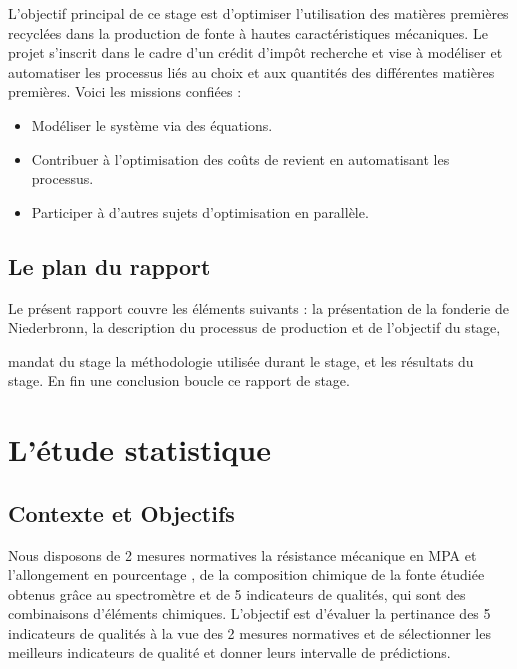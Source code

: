 \documentclass[12pt]{article}
\begin{document}
L’objectif principal de ce stage est d’optimiser l’utilisation des matières 
premières recyclées dans la production de fonte à hautes caractéristiques 
mécaniques. Le projet s’inscrit dans le cadre d’un crédit d’impôt recherche 
et vise à modéliser et automatiser les processus liés au choix et aux 
quantités des différentes matières premières. Voici les missions confiées :

\begin{itemize}
    \item Modéliser le système via des équations.
    \item Contribuer à l’optimisation des coûts de revient en 
    automatisant les processus.
    \item Participer à d’autres sujets d’optimisation en parallèle.
\end{itemize}


\subsection{Le plan du rapport}

Le présent rapport couvre les éléments suivants : la présentation de 
la fonderie de Niederbronn, la description du processus 
de production et de l'objectif du stage, 

mandat du stage la méthodologie utilisée durant le stage, et les résultats du stage. En
fin une conclusion boucle ce rapport de stage.










\section{L'étude statistique}


\subsection{Contexte et Objectifs}

Nous disposons de 2 mesures normatives la résistance mécanique en MPA et l'allongement 
en pourcentage , de la composition chimique de la fonte étudiée obtenus grâce au 
spectromètre et de 5 indicateurs de qualités, qui sont des combinaisons d'éléments 
chimiques.
L'objectif est d'évaluer la pertinance des 5 indicateurs de qualités à la vue 
des 2 mesures normatives et de sélectionner  les meilleurs indicateurs de qualité 
et donner leurs intervalle de prédictions.
\end{document}
